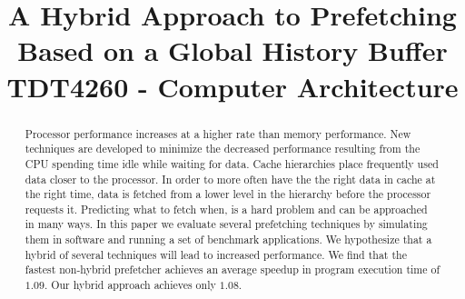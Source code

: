 \documentclass[technote]{IEEEtran}
\begin{document}
\title{A Hybrid Approach to Prefetching Based on a Global History Buffer\\ TDT4260 - Computer Architecture}

\author{

}

\maketitle

\begin{abstract}
  Processor performance increases at a higher rate than memory
  performance. New techniques are developed to minimize the decreased
  performance resulting from the CPU spending time idle while waiting
  for data. Cache hierarchies place frequently used data closer to the
  processor. In order to more often have the the right data in cache
  at the right time, data is fetched from a lower level in the
  hierarchy before the processor requests it. Predicting what to fetch
  when, is a hard problem and can be approached in many ways. In this
  paper we evaluate several prefetching techniques by simulating them
  in software and running a set of benchmark applications. We
  hypothesize that a hybrid of several techniques will lead to
  increased performance. We find that the fastest non-hybrid
  prefetcher achieves an average speedup in program execution time of
  $1.09$. Our hybrid approach achieves only $1.08$.
\end{abstract}











\end{document}
